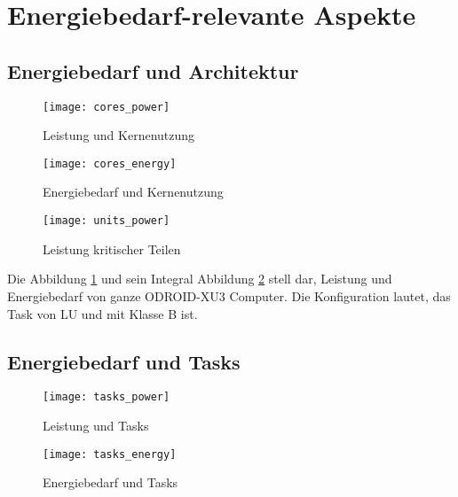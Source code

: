 \section{Energiebedarf-relevante Aspekte}
\label{sec:Energiebedarf-relevante Aspekte}

\subsection{Energiebedarf und Architektur}
\label{subsec:Energiebedarf und Architektur}

\begin{figure}[ht]
\texttt{[image: cores\_power]}
\caption[Leistung und Kernenutzung]{Leistung und Kernenutzung}
\label{fig:Leistung und Kernenutzung}
\end{figure}

\begin{figure}[ht]
\texttt{[image: cores\_energy]}
\caption[Energiebedarf und Kernenutzung]{Energiebedarf und Kernenutzung}
\label{fig:Energiebedarf und Kernenutzung}
\end{figure}

\begin{figure}[ht]
\texttt{[image: units\_power]}
\caption[Leistung kritischer Teilen]{Leistung kritischer Teilen}
\label{fig:Leistung kritischer Teilen}
\end{figure}

Die Abbildung \ref{fig:Leistung und Kernenutzung} und sein Integral Abbildung \ref{fig:Energiebedarf und Kernenutzung} stell dar, Leistung und Energiebedarf von ganze ODROID-XU3 Computer. Die Konfiguration lautet, das Task von LU und mit Klasse B ist.

\subsection{Energiebedarf und Tasks}
\label{subsec:Energiebedarf und Tasks}

\begin{figure}[ht]
\texttt{[image: tasks\_power]}
\caption[Leistung und Tasks]{Leistung und Tasks}
\label{fig:Leistung und Tasks}
\end{figure}

\begin{figure}[ht]
\texttt{[image: tasks\_energy]}
\caption[Energiebedarf und Tasks]{Energiebedarf und Tasks}
\label{fig:Energiebedarf und Tasks}
\end{figure}

